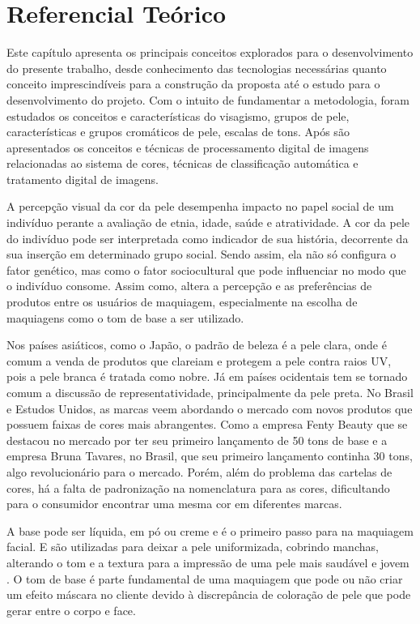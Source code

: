 \chapter{Referencial Teórico}
Este capítulo apresenta os principais conceitos explorados para o desenvolvimento do presente trabalho, desde conhecimento das tecnologias necessárias quanto conceito imprescindíveis para a construção da proposta até o estudo para o desenvolvimento do projeto. Com o intuito de fundamentar a
metodologia, foram estudados os conceitos e características do visagismo, grupos de pele, características e grupos cromáticos de pele, escalas de tons. Após são apresentados os conceitos e técnicas de processamento digital de imagens relacionadas ao sistema de cores, técnicas de classificação automática e tratamento digital de imagens.

A percepção visual da cor da pele desempenha impacto no papel social de um indivíduo perante a avaliação de etnia, idade, saúde e atratividade. A cor da pele do indivíduo pode ser interpretada como indicador de sua história, decorrente da sua inserção em determinado grupo social. Sendo assim,  ela não só configura o fator genético, mas como o fator sociocultural que pode influenciar no modo que o indivíduo consome. Assim como, altera a percepção e as preferências de produtos entre os usuários de maquiagem, especialmente na escolha de maquiagens como o tom de base a ser utilizado. 

Nos países asiáticos, como o Japão, o padrão de beleza é a pele clara, onde é comum a venda de produtos que clareiam e protegem a pele contra raios UV, pois a pele branca é tratada como nobre. Já em países ocidentais tem se tornado comum a discussão de representatividade, principalmente da pele preta. No Brasil e Estudos Unidos, as marcas veem abordando o mercado com novos produtos que possuem faixas de cores mais abrangentes. Como a empresa Fenty Beauty que se destacou no mercado por ter seu primeiro lançamento de 50 tons de base e a empresa Bruna Tavares, no Brasil, que seu primeiro lançamento continha 30 tons, algo revolucionário para o mercado. Porém, além do problema das cartelas de cores, há a falta de padronização na nomenclatura para as cores, dificultando para o consumidor encontrar uma mesma cor em diferentes marcas.

A base pode ser líquida, em pó ou creme e é o primeiro passo para na maquiagem facial.  E são utilizadas para deixar a pele uniformizada, cobrindo manchas, alterando o tom e a textura para a impressão de uma pele mais saudável e jovem \cite{Foundation}. O tom de base é parte fundamental de uma maquiagem que pode ou não criar um efeito máscara no cliente devido à discrepância de coloração de pele que pode gerar entre o corpo e face.


